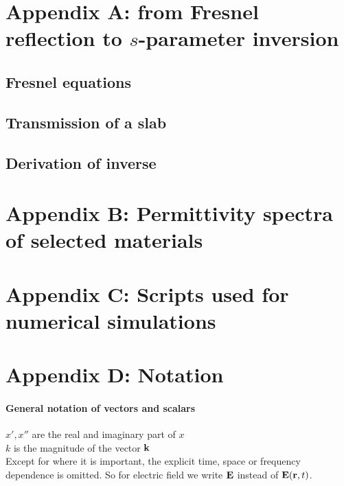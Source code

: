 
\section{Appendix A: from Fresnel reflection to $s$-parameter inversion} %
\subsection{Fresnel equations} %
\subsection{Transmission of a slab} %
\subsection{Derivation of inverse } %

\section{Appendix B: Permittivity spectra of selected materials} %

\section{Appendix C: Scripts used for numerical simulations} %

\section{Appendix D: Notation} %



\paragraph{General notation of vectors and scalars} %
$x', x''$ are the	real and imaginary part of $x$\\
$k$ 		is the magnitude of the vector ${\mathbf{k}}$\\

Except for where it is important, the explicit time, space or frequency dependence is omitted. So for electric field we write $\mathbf{E}$ instead of $\mathbf{E}({\mathbf{r}},t)$.

